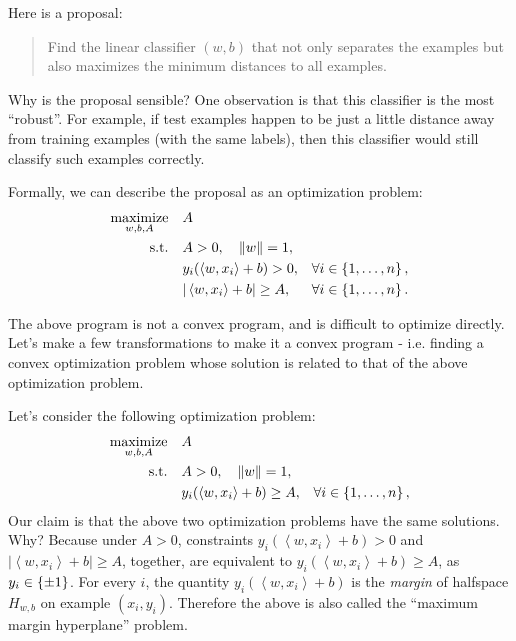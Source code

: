\documentclass{article}
\DeclareMathOperator*{\maximize}{{\rm maximize}}
\DeclareMathOperator*{\st}{{\rm s.t.}}
\newcommand{\inner}[2]{\left\langle #1,#2 \right\rangle}
\begin{document}
Here is a proposal:
\begin{quote}
  Find the linear classifier $(w,b)$ that not only separates the examples but also maximizes the minimum distances to all examples.
\end{quote}
Why is the proposal sensible? One observation is that this classifier is the most ``robust''. For example, if test examples happen to be just a little distance away from training examples (with the same labels), then this classifier would still classify such examples correctly.

Formally, we can describe the proposal as an optimization problem:
\begin{align}
  \maximize_{w,b,A} \quad & A & \label{eqn:orig} \\
    \st \quad & A > 0, \quad \| w \| = 1, & \nonumber \\
    &  y_i(\inner{w}{x_i} + b) > 0, &\forall i \in \cbr{1,\ldots,n},\nonumber \\
    & |\inner{w}{x_i} + b| \geq A, & \forall i \in \cbr{1,\ldots,n}. \nonumber
\end{align}

The above program is not a convex program, and is difficult to optimize directly.
Let's make a few transformations to make it a convex program - i.e. finding a convex optimization problem whose solution is related to that of the above optimization problem.

Let's consider the following optimization problem:
\begin{align}
  \maximize_{w,b,A} \quad & A & \label{eqn:pos} \\
    \st \quad & A > 0, \quad \| w \| = 1, & \nonumber \\
    &  y_i(\inner{w}{x_i} + b) \geq A, &\forall i \in \cbr{1,\ldots,n}, \nonumber
\end{align}
Our claim is that the above two optimization problems have the same solutions. Why?
Because under $A > 0$, constraints $y_i(\inner{w}{x_i} + b) > 0$ and $|\inner{w}{x_i} + b| \geq A$, together, are equivalent to $y_i(\inner{w}{x_i} + b) \geq A$, as $y_i \in \cbr{\pm 1}$. For every $i$, the quantity $y_i(\inner{w}{x_i} + b)$ is the {\em margin} of halfspace $H_{w,b}$ on example $(x_i, y_i)$.
Therefore the above is also called the ``maximum margin hyperplane'' problem.
\end{document}
